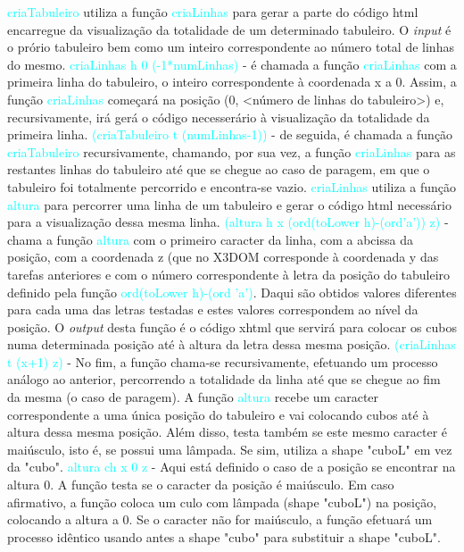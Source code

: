 \documentclass[12pt,a4paper]{article}
\begin{document}
\textsf{\indent \textcolor{cyan}{criaTabuleiro} utiliza a fun\c{c}ão \textcolor{cyan}{criaLinhas} para gerar a parte do código} html \textsf{encarregue da visualiza\c{c}ão da totalidade de um determinado tabuleiro. O \textit{input} é o prório tabuleiro bem como um inteiro correspondente ao número total de linhas do mesmo.
\newline \indent \textcolor{cyan}{criaLinhas h 0 (-1*numLinhas)} - é chamada a fun\c{c}ão \textcolor{cyan}{criaLinhas} com a primeira linha do tabuleiro, o inteiro correspondente à coordenada x a 0. Assim, a fun\c{c}ão \textcolor{cyan}{criaLinhas} começará na posi\c{c}ão (0, <número de linhas do tabuleiro>) e, recursivamente, irá gerá o código necesserário à visualiza\c{c}ão da totalidade da primeira linha.
\newline \indent \textcolor{cyan}{(criaTabuleiro t (numLinhas-1))} - de seguida, é chamada a fun\c{c}ão \textcolor{cyan}{criaTabuleiro} recursivamente, chamando, por sua vez, a fun\c{c}ão \textcolor{cyan}{criaLinhas} para as restantes linhas do tabuleiro até que se chegue ao caso de paragem, em que o tabuleiro foi totalmente percorrido e encontra-se vazio.
\newline \indent \textcolor{cyan}{criaLinhas} utiliza a fun\c{c}ão \textcolor{cyan}{altura} para percorrer uma linha de um tabuleiro e gerar o código} html \textsf{necessário para a visualiza\c{c}ão dessa mesma linha.
\newline \indent \textcolor{cyan}{(altura h x (ord(toLower h)-(ord'a')) z)} - chama a fun\c{c}ão \textcolor{cyan}{altura} com o primeiro caracter da linha, com a abcissa da posi\c{c}ão, com a coordenada z (que no} X3DOM \textsf{corresponde à coordenada y das tarefas anteriores e com o número correspondente à letra da posi\c{c}ão do tabuleiro definido pela fun\c{c}ão \textcolor{cyan}{ord(toLower h)-(ord 'a')}. Daqui são obtidos valores diferentes para cada uma das letras testadas e estes valores correspondem ao nível da posi\c{c}ão. O \textit{output} desta fun\c{c}ão é o código} xhtml \textsf{que servirá para colocar os cubos numa determinada posi\c{c}ão até à altura da letra dessa mesma posi\c{c}ão.}
\newline \indent \textcolor{cyan}{(criaLinhas t (x+1) z)} - No fim, a fun\c{c}ão chama-se recursivamente, efetuando um processo análogo ao anterior, percorrendo a totalidade da linha até que se chegue ao fim da mesma (o caso de paragem).
\newline \indent A fun\c{c}ão \textcolor{cyan}{altura} recebe um caracter correspondente a uma única posi\c{c}ão do tabuleiro e vai colocando cubos até à altura dessa mesma posi\c{c}ão. Além disso, testa também se este mesmo caracter é maiúsculo, isto é, se possui uma lâmpada. Se sim, utiliza a shape "cuboL" em vez da "cubo".
\newline \indent \textcolor{cyan}{altura ch x 0 z} - Aqui está definido o caso de a posi\c{c}ão se encontrar na altura 0. A fun\c{c}ão testa se o caracter da posi\c{c}ão é maiúsculo. Em caso afirmativo, a fun\c{c}ão coloca um culo com lâmpada (shape "cuboL") na posi\c{c}ão, colocando a altura a 0. Se o caracter não for maiúsculo, a fun\c{c}ão efetuará um processo idêntico usando antes a shape "cubo" para substituir a shape "cuboL".
\end{document}
